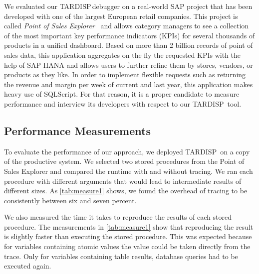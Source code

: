 \documentclass[english,conference,final]{IEEEtran}
\newcommand{\tool}{TAR\-DISP}
\begin{document}

We evaluated our \tool\,debugger on a real-world SAP project that has been developed with one of the largest European retail companies. 
This project is called \emph{Point of Sales Explorer}~\cite{plattner2015memory} and allows category managers to see a collection of the most important key performance indicators (KPIs) for several thousands of products in a unified dashboard.
Based on more than 2 billion records of point of sales data, this application aggregates on the fly the requested KPIs with the help of SAP HANA and allows users to further refine them by stores, vendors, or products as they like. 
In order to implement flexible requests such as returning the revenue and margin per week of current and last year, this application makes heavy use of SQLScript. 
For that reason, it is a proper candidate to measure performance and interview its developers with respect to our \tool\ tool. 

\subsection{Performance Measurements}

To evaluate the performance of our approach, we deployed \tool\ on a copy of the productive system.
We selected two stored procedures from the Point of Sales Explorer and compared the runtime with and without tracing.
We ran each procedure with different arguments that would lead to intermediate results of different sizes.
As \cref{tab:measure1} shows, we found the overhead of tracing to be consistently between six and seven percent.

We also measured the time it takes to reproduce the results of each stored procedure.
The measurements in \cref{tab:measure1} show that reproducing the result is slightly faster than executing the stored procedure.
This was expected because for variables containing atomic values the value could be taken directly from the trace.
Only for variables containing table results, database queries had to be executed again.
\end{document}

